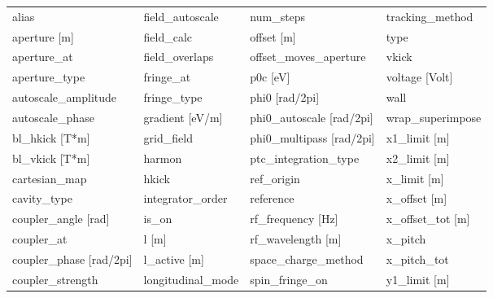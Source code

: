  \begin{tabular}{llll} \toprule
alias                            & field_autoscale                  & num_steps                        & tracking_method                  \\
aperture [m]                     & field_calc                       & offset [m]                       & type                             \\
aperture_at                      & field_overlaps                   & offset_moves_aperture            & vkick                            \\
aperture_type                    & fringe_at                        & p0c [eV]                         & voltage [Volt]                   \\
autoscale_amplitude              & fringe_type                      & phi0 [rad/2pi]                   & wall                             \\
autoscale_phase                  & gradient [eV/m]                  & phi0_autoscale [rad/2pi]         & wrap_superimpose                 \\
bl_hkick [T*m]                   & grid_field                       & phi0_multipass [rad/2pi]         & x1_limit [m]                     \\
bl_vkick [T*m]                   & harmon                           & ptc_integration_type             & x2_limit [m]                     \\
cartesian_map                    & hkick                            & ref_origin                       & x_limit [m]                      \\
cavity_type                      & integrator_order                 & reference                        & x_offset [m]                     \\
coupler_angle [rad]              & is_on                            & rf_frequency [Hz]                & x_offset_tot [m]                 \\
coupler_at                       & l [m]                            & rf_wavelength [m]                & x_pitch                          \\
coupler_phase [rad/2pi]          & l_active [m]                     & space_charge_method              & x_pitch_tot                      \\
coupler_strength                 & longitudinal_mode                & spin_fringe_on                   & y1_limit [m]                     \\

\end{tabular}

